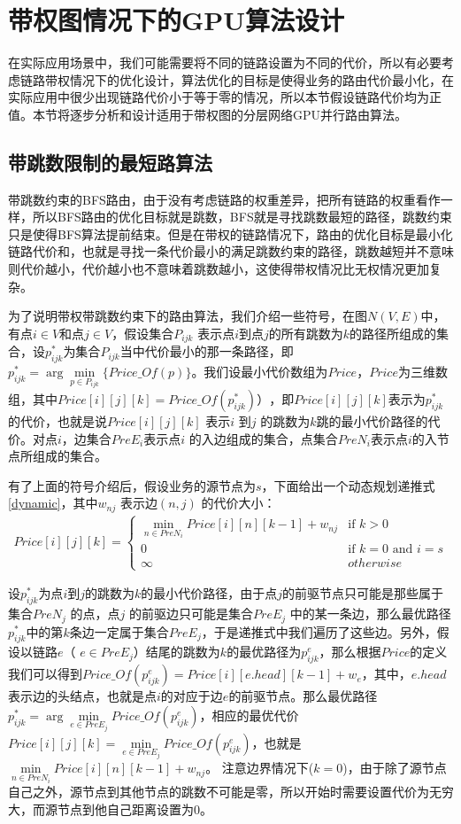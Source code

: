 \section{带权图情况下的GPU算法设计}

在实际应用场景中，我们可能需要将不同的链路设置为不同的代价，所以有必要考虑链路带权情况下的优化设计，算法优化的目标是使得业务的路由代价最小化，在实际应用中很少出现链路代价小于等于零的情况，所以本节假设链路代价均为正值。本节将逐步分析和设计适用于带权图的分层网络GPU并行路由算法。
\subsection{带跳数限制的最短路算法}
带跳数约束的BFS路由，由于没有考虑链路的权重差异，把所有链路的权重看作一样，所以BFS路由的优化目标就是跳数，BFS就是寻找跳数最短的路径，跳数约束只是使得BFS算法提前结束。但是在带权的链路情况下，路由的优化目标是最小化链路代价和，也就是寻找一条代价最小的满足跳数约束的路径，跳数越短并不意味则代价越小，代价越小也不意味着跳数越小，这使得带权情况比无权情况更加复杂。

为了说明带权带跳数约束下的路由算法，我们介绍一些符号，在图$N(V,E)$中，有点$i \in V$和点$j \in V$，假设集合$P_{ijk}$ 表示点$i$到点$j$的所有跳数为$k$的路径所组成的集合，设$p_{ijk}^*$为集合$P_{ijk}$当中代价最小的那一条路径，即$p_{ijk}^* =\arg\min\limits_{p \in P_{ijk}}\{Price\_Of(p)\}$。我们设最小代价数组为$Price$，$Price$为三维数组，其中$Price[i][j][k]=Price\_Of(p_{ijk}^*) ）$，即$Price[i][j][k]$表示为$p_{ijk}^*$ 的代价，也就是说$Price[i][j][k]$ 表示$i$ 到$j$ 的跳数为$k$跳的最小代价路径的代价。对点$i$，边集合$PreE_i$表示点$i$ 的入边组成的集合，点集合$PreN_i$表示点$i$的入节点所组成的集合。

有了上面的符号介绍后，假设业务的源节点为$s$，下面给出一个动态规划递推式\ref{dynamic}，其中$w_{nj}$ 表示边$(n,j)$ 的代价大小：
\begin{equation}\label{dynamic}
\begin{split}
Price[i][j][k]
=\begin{cases}
\min\limits_{n \in PreN_i}{Price[i][n][k-1]+w_{nj}} & \text{if $k>0$}\\
0 & \text{if $k=0$ and $i=s $} \\
\infty &{otherwise}
\end{cases}
\end{split}
\end{equation}

设$p_{ijk}^*$为点$i$到$j$的跳数为$k$的最小代价路径，由于点$j$的前驱节点只可能是那些属于集合$PreN_j$ 的点，点$j$ 的前驱边只可能是集合$PreE_j$ 中的某一条边，那么最优路径$p_{ijk}^*$中的第$k$条边一定属于集合$PreE_j$，于是递推式中我们遍历了这些边。另外，假设以链路$e$（ $e \in PreE_j$）结尾的跳数为$k$的最优路径为$p_{ijk}^e$，那么根据$Price$的定义我们可以得到$Price\_Of(p_{ijk}^e)=Price[i][e.head][k-1]+w_e$，其中，$e.head$表示边的头结点，也就是点$i$的对应于边$e$的前驱节点。那么最优路径$p_{ijk}^*=\arg\min\limits_{e \in PreE_j}{Price\_Of(p_{ijk}^e)}$，相应的最优代价$Price[i][j][k]=\min\limits_{e \in PreE_j}{Price\_Of(p_{ijk}^e)}$，也就是$\min\limits_{n \in PreN_i}{Price[i][n][k-1]+w_{nj}}$。 注意边界情况下($k=0$)，由于除了源节点自己之外，源节点到其他节点的跳数不可能是零，所以开始时需要设置代价为无穷大，而源节点到他自己距离设置为0。

